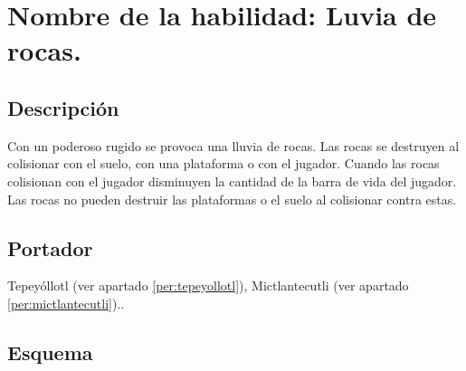 \section{Nombre de la habilidad: Luvia de rocas.} \label{hab.LLuviaRocas}
\subsection{Descripción}
Con un poderoso rugido se provoca una lluvia de rocas. Las rocas se destruyen al colisionar con el suelo, con una plataforma o con el jugador. Cuando las rocas colisionan con el jugador disminuyen la cantidad de la barra de vida del jugador. Las rocas no pueden destruir las plataformas o el suelo al colisionar contra estas.
\subsection{Portador}
Tepeyóllotl (ver apartado \ref{per:tepeyollotl}), Mictlantecutli (ver apartado \ref{per:mictlantecutli})..
\subsection{Esquema}
			